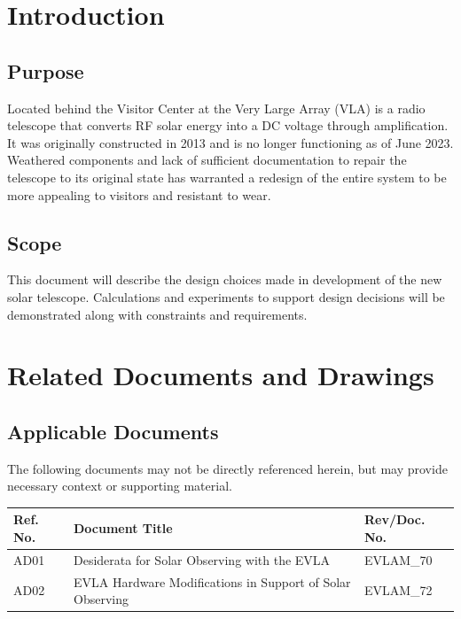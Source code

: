 \documentclass[titlepage]{article}
\begin{document}
\newpage
\tableofcontents
\listoffigures
\thispagestyle{fancy}
\newpage

\section{Introduction}

\subsection{Purpose}
Located behind the Visitor Center at the Very Large Array (VLA) is a radio telescope that converts RF solar energy into a DC voltage through amplification. It was originally constructed in 2013 and is no longer functioning as of June 2023. Weathered components and lack of sufficient documentation to repair the telescope to its original state has warranted a redesign of the entire system to be more appealing to visitors and resistant to wear.

\subsection{Scope}
This document will describe the design choices made in development of the new solar telescope. Calculations and experiments to support design decisions will be demonstrated along with constraints and requirements.


\section{Related Documents and Drawings}
\subsection{Applicable Documents}
The following documents may not be directly referenced herein, but may provide necessary context or supporting material.
\begin{center}
\begin{tabular}{|m{2cm}|m{8cm}|m{3cm}|} \hline
    \rowcolor{nraoblue}
    Ref. No. & Document Title & Rev/Doc. No.\\ \hline
    AD01 & Desiderata for Solar Observing with the EVLA & EVLAM\_70 \\ 
    \hline
    AD02 & EVLA Hardware Modifications in Support of Solar Observing & EVLAM\_72 \\
    \hline
\end{tabular}
\end{center}
\end{document}
